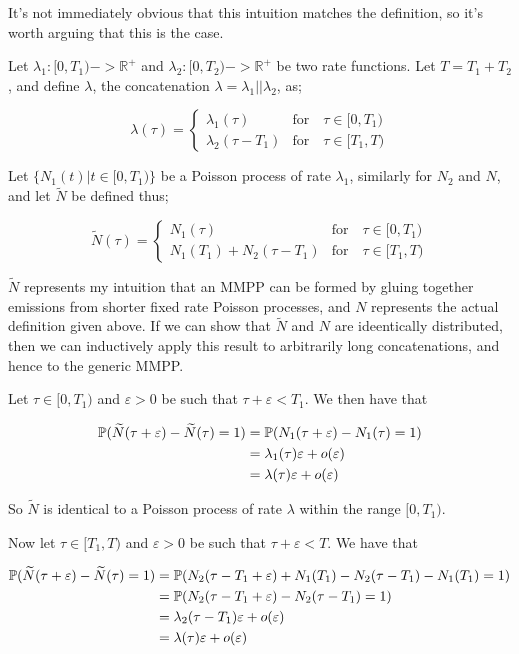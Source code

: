 It's not immediately obvious that this intuition matches the definition, so it's worth arguing that this is the case.

Let $\lambda_1: [0,T_1) -> \mathbb{R}^{+}$ and $\lambda_2:[0,T_2) -> \mathbb{R}^{+}$ be two rate functions. Let $T = T_1 + T_2$, and define $\lambda$, the concatenation $\lambda = \lambda_1 || \lambda_2$, as;

$$
\lambda(\tau) = 
\begin{cases}
	\lambda_1(\tau) & \mbox{for} \quad \tau \in [0,T_1)\\
	\lambda_2(\tau-T_1) & \mbox{for} \quad \tau \in [T_1,T)
\end{cases}
$$

Let $\{N_1(t) | t \in [0,T_1)\}$ be a Poisson process of rate $\lambda_1$, similarly for $N_2$ and $N$, and let $\widetilde{N}$ be defined thus;

$$
\widetilde{N}(\tau) = 
\begin{cases}
	N_1(\tau) & \mbox{for} \quad \tau \in [0,T_1)\\
	N_1(T_1) + N_2(\tau-T_1) & \mbox{for} \quad \tau \in [T_1,T)
\end{cases}
$$

$\widetilde{N}$ represents my intuition that an MMPP can be formed by gluing together emissions from shorter fixed rate Poisson processes, and $N$ represents the actual definition given above. If we can show that $\widetilde{N}$ and $N$ are ideentically distributed, then we can inductively apply this result to arbitrarily long concatenations, and hence to the generic MMPP.

Let $\tau \in [0,T_1)$ and $\varepsilon>0$ be such that $\tau + \varepsilon < T_1$. We then have that

\begin{align*}
\mathbb{P} (\widetilde{N}(\tau+\varepsilon) - \widetilde{N}(\tau) = 1)
	&= \mathbb{P} (N_1(\tau+\varepsilon) - N_1(\tau) = 1) \\
	&= \lambda_1(\tau)\varepsilon + o(\varepsilon) \\
	&= \lambda(\tau)\varepsilon + o(\varepsilon)
\end{align*} 

So $\widetilde{N}$ is identical to a Poisson process of rate $\lambda$ within the range $[0,T_1)$.

Now let $\tau \in [T_1,T)$ and $\varepsilon>0$ be such that $\tau + \varepsilon < T$. We have that

\begin{align*}
\mathbb{P} (\widetilde{N}(\tau+\varepsilon) - \widetilde{N}(\tau) = 1)
	&= \mathbb{P} (N_2(\tau-T_1+\varepsilon) + N_1(T_1) - N_2(\tau-T_1) - N_1(T_1)= 1)\\
	&= \mathbb{P} (N_2(\tau-T_1+\varepsilon) - N_2(\tau-T_1) = 1)\\
	&= \lambda_2(\tau-T_1)\varepsilon + o(\varepsilon) \\
	&= \lambda(\tau)\varepsilon + o(\varepsilon)
\end{align*}

